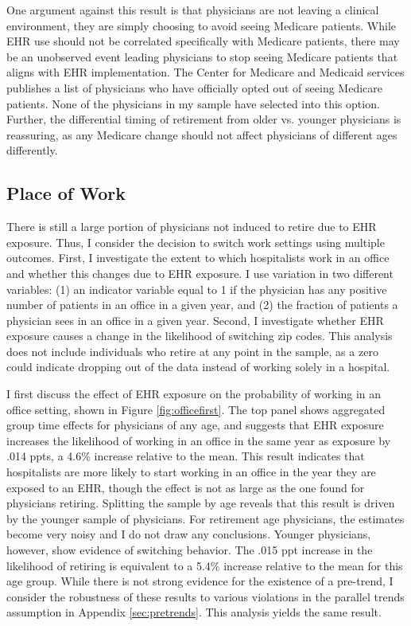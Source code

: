 \documentclass[12pt]{article}
\begin{document}
One argument against this result is that physicians are not leaving a clinical environment, they are simply choosing to avoid seeing Medicare patients. While EHR use should not be correlated specifically with Medicare patients, there may be an unobserved event leading physicians to stop seeing Medicare patients that aligns with EHR implementation. The Center for Medicare and Medicaid services publishes a list of physicians who have officially opted out of seeing Medicare patients. None of the physicians in my sample have selected into this option. Further, the differential timing of retirement from older vs. younger physicians is reassuring, as any Medicare change should not affect physicians of different ages differently.  



\subsection{Place of Work}

There is still a large portion of physicians not induced to retire due to EHR exposure. Thus, I consider the decision to switch work settings using multiple outcomes. First, I investigate the extent to which hospitalists work in an office and whether this changes due to EHR exposure. I use variation in two different variables: (1) an indicator variable equal to 1 if the physician has any positive number of patients in an office in a given year, and (2) the fraction of patients a physician sees in an office in a given year. Second, I investigate whether EHR exposure causes a change in the likelihood of switching zip codes. This analysis does not include individuals who retire at any point in the sample, as a zero could indicate dropping out of the data instead of working solely in a hospital. 

I first discuss the effect of EHR exposure on the probability of working in an office setting, shown in Figure \ref{fig:officefirst}. The top panel shows aggregated group time effects for physicians of any age, and suggests that EHR exposure increases the likelihood of working in an office in the same year as exposure by .014 ppts, a 4.6\% increase relative to the mean. This result indicates that hospitalists are more likely to start working in an office in the year they are exposed to an EHR, though the effect is not as large as the one found for physicians retiring. Splitting the sample by age reveals that this result is driven by the younger sample of physicians. For retirement age physicians, the estimates become very noisy and I do not draw any conclusions. Younger physicians, however, show evidence of switching behavior. The .015 ppt increase in the likelihood of retiring is equivalent to a 5.4\% increase relative to the mean for this age group. While there is not strong evidence for the existence of a pre-trend, I consider the robustness of these results to various violations in the parallel trends assumption in Appendix \ref{sec:pretrends}. This analysis yields the same result.
\end{document}
